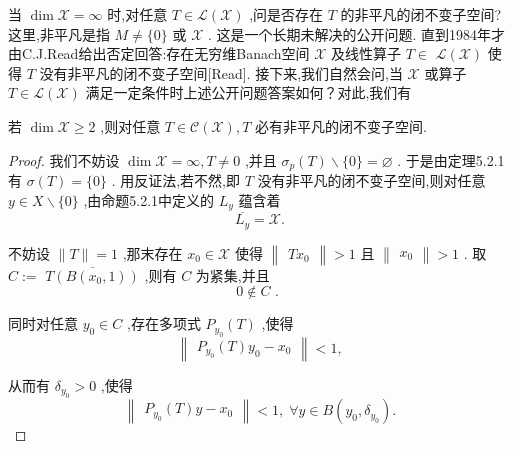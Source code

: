 \documentclass[lang=cn,newtx,10pt,scheme=chinese,thmcnt=chapter]{elegantbook}
\begin{document}
当 \(\dim \mathcal{X} = \infty\) 时,对任意 \(T \in  \mathcal{L}\left( \mathcal{X}\right)\) ,问是否存在 \(T\) 的非平凡的闭不变子空间? 这里,非平凡是指 \(M \neq  \{ 0\}\) 或 \(\mathcal{X}\) . 这是一个长期未解决的公开问题. 直到1984年才由C.J.Read给出否定回答:存在无穷维Banach空间 \(\mathcal{X}\) 及线性算子 \(T \in\)  \(\mathcal{L}\left( \mathcal{X}\right)\) 使得 \(T\) 没有非平凡的闭不变子空间[Read]. 接下来,我们自然会问,当 \(\mathcal{X}\) 或算子 \(T \in  \mathcal{L}\left( \mathcal{X}\right)\) 满足一定条件时上述公开问题答案如何？对此,我们有
\begin{theorem}
    若 \(\dim \mathcal{X} \geq  2\) ,则对任意 \(T \in  \mathcal{C}\left( \mathcal{X}\right) ,T\) 必有非平凡的闭不变子空间.
\end{theorem}
\begin{proof}
    我们不妨设 \(\dim \mathcal{X} = \infty ,T \neq  0\) ,并且 \({\sigma }_{p}\left( T\right)  \smallsetminus  \{ 0\}  = \varnothing\) . 于是由定理5.2.1有 \(\sigma \left( T\right)  = \{ 0\}\) . 用反证法,若不然,即 \(T\) 没有非平凡的闭不变子空间,则对任意 \(y \in  X \smallsetminus  \{ 0\}\) ,由命题5.2.1中定义的 \({L}_{y}\) 蕴含着
\begin{equation*}
\overline{{L}_{y}} = \mathcal{X}.
\end{equation*}

不妨设 \(\parallel T\parallel  = 1\) ,那末存在 \({x}_{0} \in  \mathcal{X}\) 使得 \(\begin{Vmatrix}{T{x}_{0}}\end{Vmatrix} > 1\) 且 \(\begin{Vmatrix}{x}_{0}\end{Vmatrix} > 1\) . 取 \(C \mathrel{\text{ := }}\)  \(\overline{T\left( {B\left( {{x}_{0},1}\right) }\right) }\) ,则有 \(C\) 为紧集,并且
\begin{equation*}
0 \notin  C\text{ . }
\end{equation*}

同时对任意 \({y}_{0} \in  C\) ,存在多项式 \({P}_{{y}_{0}}\left( T\right)\) ,使得
\begin{equation*}
\begin{Vmatrix}{{P}_{{y}_{0}}\left( T\right) {y}_{0} - {x}_{0}}\end{Vmatrix} < 1,
\end{equation*}

从而有 \({\delta }_{{y}_{0}} > 0\) ,使得
\begin{equation*}
\begin{Vmatrix}{{P}_{{y}_{0}}\left( T\right) y - {x}_{0}}\end{Vmatrix} < 1,\;\forall y \in  B\left( {{y}_{0},{\delta }_{{y}_{0}}}\right) .
\end{equation*}


\end{proof}
\end{document}
